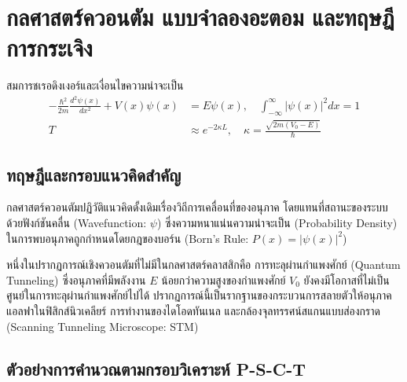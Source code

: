 
\chapter{กลศาสตร์ควอนตัม แบบจำลองอะตอม และทฤษฎีการกระเจิง}
\label{ch:chapter06}


\vspace{0.4cm}

\begin{equationsbox}{สมการชเรอดิงเงอร์และเงื่อนไขความน่าจะเป็น}
\begin{align}
-\frac{\hbar^2}{2m}\frac{d^2\psi(x)}{dx^2} + V(x)\psi(x) &= E\psi(x), \quad \int_{-\infty}^{\infty} |\psi(x)|^2 dx = 1 \\
T &\approx e^{-2\kappa L}, \quad \kappa = \frac{\sqrt{2m(V_0 - E)}}{\hbar}
\end{align}
\end{equationsbox}

\section{ทฤษฎีและกรอบแนวคิดสำคัญ}

กลศาสตร์ควอนตัมปฏิวัติแนวคิดดั้งเดิมเรื่องวิถีการเคลื่อนที่ของอนุภาค โดยแทนที่สถานะของระบบด้วยฟังก์ชันคลื่น (Wavefunction: $\psi$) ซึ่งความหนาแน่นความน่าจะเป็น (Probability Density) ในการพบอนุภาคถูกกำหนดโดยกฎของบอร์น (Born's Rule: $P(x) = |\psi(x)|^2$)

หนึ่งในปรากฏการณ์เชิงควอนตัมที่ไม่มีในกลศาสตร์คลาสสิกคือ การทะลุผ่านกำแพงศักย์ (Quantum Tunneling) ซึ่งอนุภาคที่มีพลังงาน $E$ น้อยกว่าความสูงของกำแพงศักย์ $V_0$ ยังคงมีโอกาสที่ไม่เป็นศูนย์ในการทะลุผ่านกำแพงศักย์ไปได้ ปรากฏการณ์นี้เป็นรากฐานของกระบวนการสลายตัวให้อนุภาคแอลฟาในฟิสิกส์นิวเคลียร์ การทำงานของไดโอดทันเนล และกล้องจุลทรรศน์สแกนแบบส่องกราด (Scanning Tunneling Microscope: STM)

\section{ตัวอย่างการคำนวณตามกรอบวิเคราะห์ P-S-C-T}

